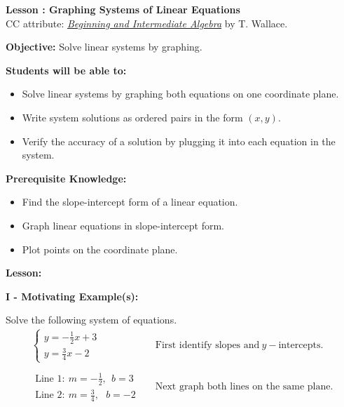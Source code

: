 \documentclass[12pt]{article}
\theoremstyle{definition}
\begin{document}
{\bf \large Lesson : Graphing Systems of Linear Equations}\label{les:graphing_systems}\\
CC attribute: \href{http://www.wallace.ccfaculty.org/book/book.html}{\it{Beginning and Intermediate Algebra}} by T. Wallace. \hfill \doclicenseImage[imagewidth=5em]\\
\par
{\bf Objective:} Solve linear systems by graphing.\\
\par
{\bf Students will be able to:}
\begin{itemize}
	\item Solve linear systems by graphing both equations on one coordinate plane.
	\item Write system solutions as ordered pairs in the form $(x,y)$.
	\item Verify the accuracy of a solution by plugging it into each equation in the system.
\end{itemize}
{\bf Prerequisite Knowledge:}
\begin{itemize}
	\item Find the slope-intercept form of a linear equation.
	\item Graph linear equations in slope-intercept form.
	\item Plot points on the coordinate plane.
\end{itemize}
\hrulefill

{\bf Lesson:}
\par
{\bf I - Motivating Example(s):}\\
\par
Solve the following system of equations.
  \begin{eqnarray*}
 	\begin{cases} 
     y = - \frac{1}{2} x + 3\\
    	y = \frac{3}{4} x - 2
  		\end{cases}
&  & \text{First identify slopes and} \ y- \text{intercepts.}\\
  & & \\ 
	\begin{array}{l}
      \text{Line 1} : \ m = - \frac{1}{2}, \ \ b = 3\\
      \text{Line 2} : \ m = \frac{3}{4}, \ \ \ b = - 2
    \end{array} &  & \text{Next graph both lines on the same plane.}\\
  \end{eqnarray*}
  
\end{document}
